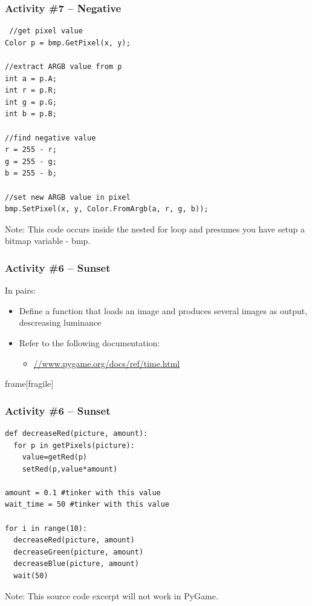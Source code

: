 \begin{frame}[fragile]
	\frametitle{Activity \#7 -- Negative}
	
\begin{lstlisting}
 //get pixel value
Color p = bmp.GetPixel(x, y);

//extract ARGB value from p
int a = p.A;
int r = p.R;
int g = p.G;
int b = p.B;

//find negative value
r = 255 - r;
g = 255 - g;
b = 255 - b;

//set new ARGB value in pixel
bmp.SetPixel(x, y, Color.FromArgb(a, r, g, b));
\end{lstlisting}

Note: This code occurs inside the nested for loop and presumes you have setup a bitmap variable - bmp.

\end{frame}
\iffalse
\begin{frame}
	\frametitle{Activity \#6 -- Sunset}
	
	In pairs:
	
	\vspace{2em}
	
	\begin{itemize}
		\item Define a function that loads an image and produces several images as output, descreasing luminance
		\item Refer to the following documentation:
		\begin{itemize}
			\item \url{//www.pygame.org/docs/ref/time.html}
		\end{itemize}
	\end{itemize}
\end{frame}

{frame}[fragile]
\frametitle{Activity \#6 -- Sunset}

\begin{lstlisting}
def decreaseRed(picture, amount):
  for p in getPixels(picture):
    value=getRed(p)
    setRed(p,value*amount)

amount = 0.1 #tinker with this value
wait_time = 50 #tinker with this value    
    
for i in range(10):
  decreaseRed(picture, amount)
  decreaseGreen(picture, amount)
  decreaseBlue(picture, amount)
  wait(50)
\end{lstlisting}

Note: This source code excerpt will not work in PyGame.

